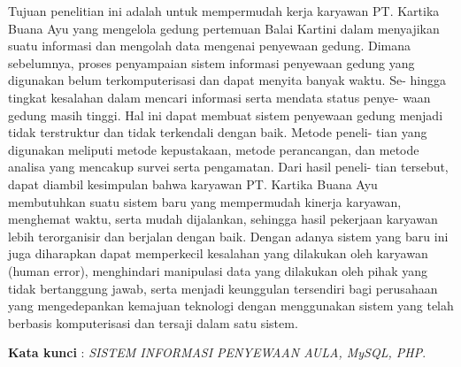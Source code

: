 \documentclass{jtetiproposalskripsi}
\begin{document}
\cover

\approvalpage


\begin{abstractind}
Tujuan penelitian ini adalah untuk mempermudah kerja karyawan PT.
Kartika Buana Ayu yang mengelola gedung pertemuan Balai Kartini dalam
menyajikan suatu informasi dan mengolah data mengenai penyewaan gedung.
Dimana sebelumnya, proses penyampaian sistem informasi penyewaan gedung
yang digunakan belum terkomputerisasi dan dapat menyita banyak waktu. Se-
hingga tingkat kesalahan dalam mencari informasi serta mendata status penye-
waan gedung masih tinggi. Hal ini dapat membuat sistem penyewaan gedung
menjadi tidak terstruktur dan tidak terkendali dengan baik. Metode peneli-
tian yang digunakan meliputi metode kepustakaan, metode perancangan, dan
metode analisa yang mencakup survei serta pengamatan. Dari hasil peneli-
tian tersebut, dapat diambil kesimpulan bahwa karyawan PT. Kartika Buana
Ayu membutuhkan suatu sistem baru yang mempermudah kinerja karyawan,
menghemat waktu, serta mudah dijalankan, sehingga hasil pekerjaan karyawan
lebih terorganisir dan berjalan dengan baik. Dengan adanya sistem yang baru
ini juga diharapkan dapat memperkecil kesalahan yang dilakukan oleh karyawan
(human error), menghindari manipulasi data yang dilakukan oleh pihak yang
tidak bertanggung jawab, serta menjadi keunggulan tersendiri bagi perusahaan
yang mengedepankan kemajuan teknologi dengan menggunakan sistem yang
telah berbasis komputerisasi dan tersaji dalam satu sistem.


\bigskip
\textbf{Kata kunci} : \emph{SISTEM INFORMASI PENYEWAAN AULA, MySQL, PHP}.
\end{abstractind}

\tableofcontents
{}
\clearpage{}\setcounter{page}{1}

\end{document}
